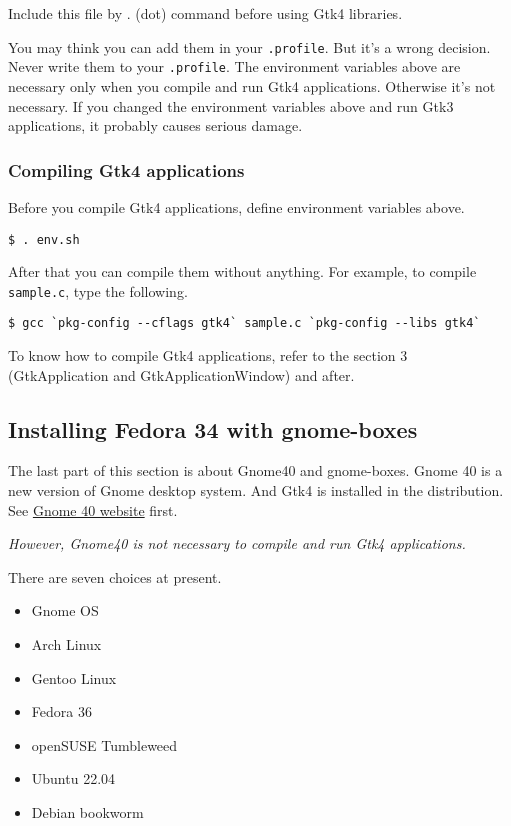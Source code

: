 Include this file by . (dot) command before using Gtk4 libraries.

You may think you can add them in your
\passthrough{\lstinline!.profile!}. But it's a wrong decision. Never
write them to your \passthrough{\lstinline!.profile!}. The environment
variables above are necessary only when you compile and run Gtk4
applications. Otherwise it's not necessary. If you changed the
environment variables above and run Gtk3 applications, it probably
causes serious damage.

\hypertarget{compiling-gtk4-applications}{%
\subsubsection{Compiling Gtk4
applications}\label{compiling-gtk4-applications}}

Before you compile Gtk4 applications, define environment variables
above.

\begin{lstlisting}
$ . env.sh
\end{lstlisting}

After that you can compile them without anything. For example, to
compile \passthrough{\lstinline!sample.c!}, type the following.

\begin{lstlisting}
$ gcc `pkg-config --cflags gtk4` sample.c `pkg-config --libs gtk4`
\end{lstlisting}

To know how to compile Gtk4 applications, refer to the section 3
(GtkApplication and GtkApplicationWindow) and after.

\hypertarget{installing-fedora-34-with-gnome-boxes}{%
\subsection{Installing Fedora 34 with
gnome-boxes}\label{installing-fedora-34-with-gnome-boxes}}

The last part of this section is about Gnome40 and gnome-boxes. Gnome 40
is a new version of Gnome desktop system. And Gtk4 is installed in the
distribution. See \href{https://forty.gnome.org/}{Gnome 40 website}
first.

\emph{However, Gnome40 is not necessary to compile and run Gtk4
applications.}

There are seven choices at present.

\begin{itemize}
\tightlist
\item
  Gnome OS
\item
  Arch Linux
\item
  Gentoo Linux
\item
  Fedora 36
\item
  openSUSE Tumbleweed
\item
  Ubuntu 22.04
\item
  Debian bookworm
\end{itemize}

